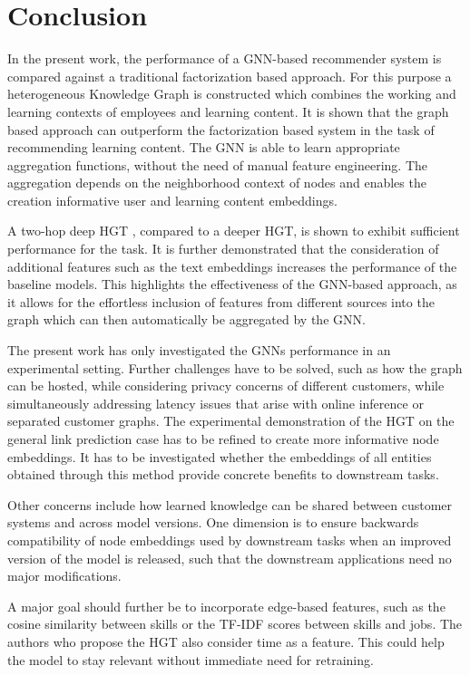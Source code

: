 \chapter{Conclusion}
In the present work, the performance of a GNN-based recommender system is compared against a traditional factorization based approach.  For this purpose a heterogeneous Knowledge Graph is constructed which combines the working and learning contexts of employees and learning content. It is shown that the graph based approach can outperform the factorization based system in the task of recommending learning content. The GNN is able to learn appropriate aggregation functions, without the need of manual feature engineering. The aggregation depends on the neighborhood context of nodes and enables the creation informative user and learning content embeddings. 

A two-hop deep HGT \parencite{hu2020heterogeneous}, compared to a deeper HGT, is shown to exhibit sufficient performance for the task. It is further demonstrated that the consideration of additional features such as the text embeddings increases the performance of the baseline models. This highlights the effectiveness of the GNN-based approach, as it allows for the effortless inclusion of features from different sources into the graph which can then automatically be aggregated by the GNN.

The present work has only investigated the GNNs performance in an experimental setting. Further challenges have to be solved, such as how the graph can be hosted, while considering privacy concerns of different customers, while simultaneously addressing latency issues that arise with online inference or separated customer graphs. The experimental demonstration of the HGT on the general link prediction case has to be refined to create more informative node embeddings. It has to be investigated whether the embeddings of all entities obtained through this method provide concrete benefits to downstream tasks.

Other concerns include how learned knowledge can be shared between customer systems and across model versions. One dimension is to ensure backwards compatibility of node embeddings\parencite{hu2022learning} used by downstream tasks when an improved version of the model is released, such that the downstream applications need no major modifications. 

A major goal should further be to incorporate edge-based features, such as the cosine similarity between skills or the TF-IDF scores between skills and jobs. The authors who propose the HGT 
 \parencite{hu2020heterogeneous} also consider time as a feature. This could help the model to stay relevant without immediate need for retraining. 
 
